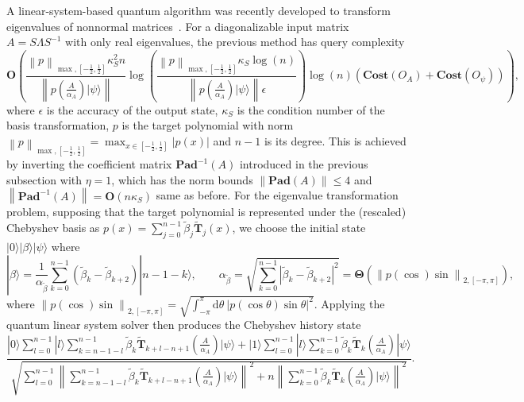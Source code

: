 \documentclass[letterpaper,onecolumn,11pt,accepted=2026-02-14]{quantumarticle}
\newcommand{\abs}[1]{\left\lvert#1\right\rvert}
\newcommand{\norm}[1]{\left\lVert#1\right\rVert}
\theoremstyle{remark}
\theoremstyle{plain}
\newcommand{\ket}[1]{|#1\rangle}
\begin{document}
A linear-system-based quantum algorithm was recently developed to transform eigenvalues of nonnormal matrices~\cite[Theorem 4 and 10]{QEVP}. For a diagonalizable input matrix $A=S\Lambda S^{-1}$ with only real eigenvalues, the previous method has query complexity
\begin{equation}
    \mathbf{O}\left(
    \frac{\norm{p}_{\max,\left[-\frac{1}{2},\frac{1}{2}\right]}\kappa_S^2n}{\norm{p\left(\frac{A}{\alpha_A}\right)\ket{\psi}}}
    \log\left(
    \frac{\norm{p}_{\max,\left[-\frac{1}{2},\frac{1}{2}\right]}\kappa_S\log(n)}{\norm{p\left(\frac{A}{\alpha_A}\right)\ket{\psi}}\epsilon}\right)\log\left(n\right)
    \left(\mathbf{Cost}\left(O_A\right)
    +\mathbf{Cost}\left(O_{\psi}\right)\right)\right),
\end{equation}
where $\epsilon$ is the accuracy of the output state, $\kappa_S$ is the condition number of the basis transformation, $p$ is the target polynomial with norm $\norm{p}_{\max,\left[-\frac{1}{2},\frac{1}{2}\right]}=\max_{x\in\left[-\frac{1}{2},\frac{1}{2}\right]}\abs{p(x)}$ and $n-1$ is its degree.
This is achieved by inverting the coefficient matrix $\mathbf{Pad}^{-1}(A)$ introduced in the previous subsection with $\eta=1$, which has the norm bounds $\norm{\mathbf{Pad}(A)}\leq 4$ and $\norm{\mathbf{Pad}^{-1}(A)}=\mathbf{O}(n\kappa_S)$ same as before. For the eigenvalue transformation problem, supposing that the target polynomial is represented under the (rescaled) Chebyshev basis as $p(x)=\sum_{j=0}^{n-1}\widetilde{\beta}_j\widetilde{\mathbf{T}}_j(x)$, we choose the initial state $\ket{0}\ket{\beta}\ket{\psi}$ where
\begin{equation}
\label{eq:beta_state}
    \ket{\beta}=\frac{1}{\alpha_{\widetilde{\beta}}}\sum_{k=0}^{n-1}(\widetilde\beta_k-\widetilde\beta_{k+2})\ket{n-1-k},\qquad
    \alpha_{\widetilde{\beta}}=\sqrt{\sum_{k=0}^{n-1}|\widetilde{\beta}_k-\widetilde{\beta}_{k+2}|^2}
    =\mathbf{\Theta}\left(\norm{p(\cos)\sin}_{2,[-\pi,\pi]}\right),
\end{equation}
where $\norm{p(\cos)\sin}_{2,[-\pi,\pi]}=\sqrt{\int_{-\pi}^{\pi}\mathrm{d}\theta\
    \abs{p(\cos{\theta})\sin{\theta}}^2}$.
Applying the quantum linear system solver then produces the Chebyshev history state
    \begin{equation}
        \frac{\ket{0}\sum_{l=0}^{n-1}\ket{l}
        \sum_{k=n-1-l}^{n-1}\widetilde{\beta}_k\widetilde{\mathbf{T}}_{k+l-n+1}\left(\frac{A}{\alpha_A}\right)\ket{\psi}
        +\ket{1}\sum_{l=0}^{n-1}\ket{l}
        \sum_{k=0}^{n-1}\widetilde{\beta}_k\widetilde{\mathbf{T}}_{k}\left(\frac{A}{\alpha_A}\right)\ket{\psi}}
        {\sqrt{\sum_{l=0}^{n-1}\norm{\sum_{k=n-1-l}^{n-1}\widetilde{\beta}_k\widetilde{\mathbf{T}}_{k+l-n+1}\left(\frac{A}{\alpha_A}\right)\ket{\psi}}^2
        +n\norm{\sum_{k=0}^{n-1}\widetilde{\beta}_k\widetilde{\mathbf{T}}_{k}\left(\frac{A}{\alpha_A}\right)\ket{\psi}}^2}}.
    \end{equation}
\end{document}
